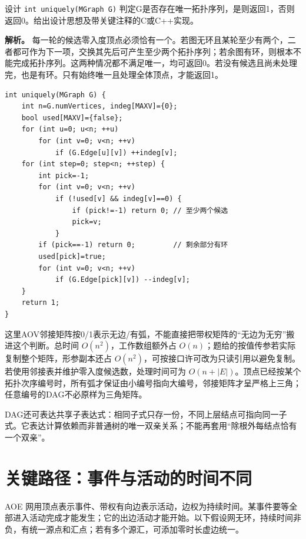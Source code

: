 设计 \allowbreak{}\texttt{int\ uniquely(MGraph\ G)} 判定G是否存在唯一拓扑序列，是则返回1，否则返回0。给出设计思想及带关键注释的C或C++实现。


\textbf{解析。} 每一轮的候选零入度顶点必须恰有一个。若图无环且某轮至少有两个，二者都可作为下一项，交换其先后可产生至少两个拓扑序列；若余图有环，则根本不能完成拓扑序列。这两种情况都不满足唯一，均可返回0。若没有候选且尚未处理完，也是有环。只有始终唯一且处理全体顶点，才能返回1。

\par\medskip\noindent
\begin{minipage}{\linewidth}
\begin{verbatim}
int uniquely(MGraph G) {
    int n=G.numVertices, indeg[MAXV]={0};
    bool used[MAXV]={false};
    for (int u=0; u<n; ++u)
        for (int v=0; v<n; ++v)
            if (G.Edge[u][v]) ++indeg[v];
    for (int step=0; step<n; ++step) {
        int pick=-1;
        for (int v=0; v<n; ++v)
            if (!used[v] && indeg[v]==0) {
                if (pick!=-1) return 0; // 至少两个候选
                pick=v;
            }
        if (pick==-1) return 0;         // 剩余部分有环
        used[pick]=true;
        for (int v=0; v<n; ++v)
            if (G.Edge[pick][v]) --indeg[v];
    }
    return 1;
}
\end{verbatim}
\end{minipage}\par\medskip

这里AOV邻接矩阵按0/1表示无边/有弧，不能直接把带权矩阵的``无边为无穷''搬进这个判断。总时间 \(O(n^2)\)，工作数组额外占 \(O(n)\)；题给的按值传参若实际复制整个矩阵，形参副本还占 \(O(n^2)\)，可按接口许可改为只读引用以避免复制。若使用邻接表并维护零入度候选数，处理时间可为 \(O(n+|E|)\)。顶点已经按某个拓扑次序编号时，所有弧才保证由小编号指向大编号，邻接矩阵才呈严格上三角；任意编号的DAG不必原样为三角矩阵。

DAG还可表达共享子表达式：相同子式只存一份，不同上层结点可指向同一子式。它表达计算依赖而非普通树的唯一双亲关系；不能再套用``除根外每结点恰有一个双亲''。

\section{关键路径：事件与活动的时间不同}\label{ds-06-09}

AOE 网用顶点表示事件、带权有向边表示活动，边权为持续时间。某事件要等全部进入活动完成才能发生；它的出边活动才能开始。以下假设网无环，持续时间非负，有统一源点和汇点；若有多个源汇，可添加零时长虚边统一。

